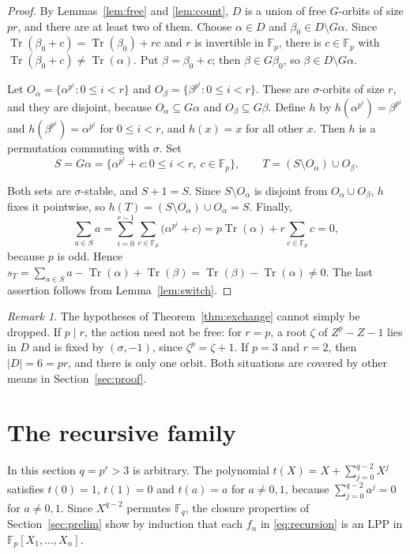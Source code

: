 \documentclass[11pt]{amsart}
\theoremstyle{definition}
\theoremstyle{remark}
\newtheorem{remark}[theorem]{Remark}
\newcommand{\F}{\mathbb{F}}
\newcommand{\Tr}{\operatorname{Tr}}
\begin{document}
\begin{proof}
By Lemmas~\ref{lem:free} and \ref{lem:count}, $D$ is a union of free $G$-orbits of size $pr$, and there are at least two of them. Choose $\alpha\in D$ and $\beta_0\in D\setminus G\alpha$. Since $\Tr(\beta_0+c)=\Tr(\beta_0)+rc$ and $r$ is invertible in $\F_p$, there is $c\in\F_p$ with $\Tr(\beta_0+c)\ne\Tr(\alpha)$. Put $\beta=\beta_0+c$; then $\beta\in G\beta_0$, so $\beta\in D\setminus G\alpha$.

Let $O_\alpha=\{\alpha^{p^i}:0\le i<r\}$ and $O_\beta=\{\beta^{p^i}:0\le i<r\}$. These are $\sigma$-orbits of size $r$, and they are disjoint, because $O_\alpha\subseteq G\alpha$ and $O_\beta\subseteq G\beta$. Define $h$ by $h(\alpha^{p^i})=\beta^{p^i}$ and $h(\beta^{p^i})=\alpha^{p^i}$ for $0\le i<r$, and $h(x)=x$ for all other $x$. Then $h$ is a permutation commuting with $\sigma$. Set
\[
S=G\alpha=\{\alpha^{p^i}+c:0\le i<r,\ c\in\F_p\},\qquad T=(S\setminus O_\alpha)\cup O_\beta.
\]

Both sets are $\sigma$-stable, and $S+1=S$. Since $S\setminus O_\alpha$ is disjoint from $O_\alpha\cup O_\beta$, $h$ fixes it pointwise, so $h(T)=(S\setminus O_\alpha)\cup O_\alpha=S$. Finally,
\[
\sum_{a\in S}a=\sum_{i=0}^{r-1}\sum_{c\in\F_p}\bigl(\alpha^{p^i}+c\bigr)=p\Tr(\alpha)+r\sum_{c\in\F_p}c=0,
\]
because $p$ is odd. Hence $s_T=\sum_{a\in S}a-\Tr(\alpha)+\Tr(\beta)=\Tr(\beta)-\Tr(\alpha)\ne0$. The last assertion follows from Lemma~\ref{lem:switch}.
\end{proof}

\begin{remark}
The hypotheses of Theorem~\ref{thm:exchange} cannot simply be dropped. If $p\mid r$, the action need not be free: for $r=p$, a root $\zeta$ of $Z^p-Z-1$ lies in $D$ and is fixed by $(\sigma,-1)$, since $\zeta^p=\zeta+1$. If $p=3$ and $r=2$, then $|D|=6=pr$, and there is only one orbit. Both situations are covered by other means in Section~\ref{sec:proof}.
\end{remark}

\section{The recursive family}\label{sec:recursion}

In this section $q=p^r>3$ is arbitrary. The polynomial $t(X)=X+\sum_{j=0}^{q-2}X^j$ satisfies $t(0)=1$, $t(1)=0$ and $t(a)=a$ for $a\ne0,1$, because $\sum_{j=0}^{q-2}a^j=0$ for $a\ne0,1$. Since $X^{q-2}$ permutes $\F_q$, the closure properties of Section~\ref{sec:prelim} show by induction that each $f_n$ in \eqref{eq:recursion} is an LPP in $\F_p[X_1,\dots,X_n]$.
\end{document}
